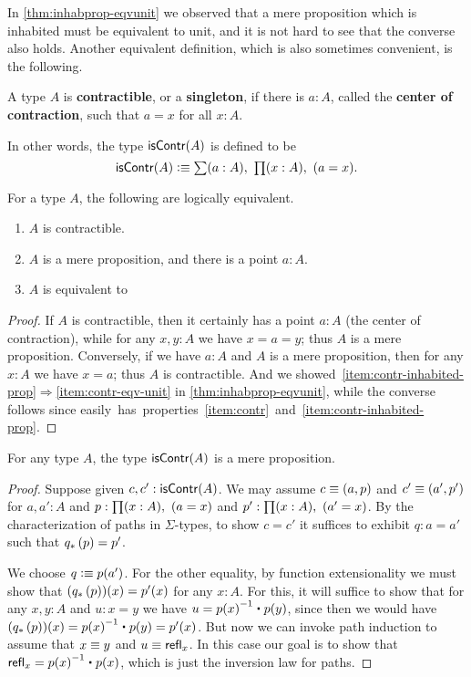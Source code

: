 In \autoref{thm:inhabprop-eqvunit} we observed that a mere proposition which is inhabited must be equivalent to unit, and it is not hard to see that the converse also holds.
Another equivalent definition, which is also sometimes convenient, is the following.

\begin{defn}\label{defn:contractible}
  A type $A$ is \textbf{contractible}, or a \textbf{singleton}, if there is $a:A$, called the \textbf{center of contraction}, such that $a=x$ for all $x:A$.
\end{defn}

In other words, the type $\mathsf{isContr}(A)$ is defined to be
\[ \iscontr(A) \defeq \sm{a:A} \prd{x:A}(a=x). \]

\begin{lem}\label{thm:contr-paths}
  For a type $A$, the following are logically equivalent.
  \begin{enumerate}
  \item $A$ is contractible.\label{item:contr}
  \item $A$ is a mere proposition, and there is a point $a:A$.\label{item:contr-inhabited-prop}
  \item $A$ is equivalent to \unit.\label{item:contr-eqv-unit}
  \end{enumerate}
\end{lem}
\begin{proof}
  If $A$ is contractible, then it certainly has a point $a:A$ (the center of contraction), while for any $x,y:A$ we have $x=a=y$; thus $A$ is a mere proposition.
  Conversely, if we have $a:A$ and $A$ is a mere proposition, then for any $x:A$ we have $x=a$; thus $A$ is contractible.
  And we showed~\ref{item:contr-inhabited-prop}$\Rightarrow$\ref{item:contr-eqv-unit} in \autoref{thm:inhabprop-eqvunit}, while the converse follows since \unit easily has properties~\ref{item:contr} and~\ref{item:contr-inhabited-prop}.
\end{proof}

\begin{lem}\label{thm:isprop-iscontr}
  For any type $A$, the type $\mathsf{isContr}(A)$ is a mere proposition.
\end{lem}
\begin{proof}
  Suppose given $c,c':\mathsf{isContr}(A)$.
  We may assume $c\equiv(a,p)$ and $c'\equiv(a',p')$ for $a,a':A$ and $p:\prd{x:A} (a=x)$ and $p':\prd{x:A} (a'=x)$.
  By the characterization of paths in $\Sigma$-types, to show $c=c'$ it suffices to exhibit $q:a=a'$ such that ${q}_{*}\left({p}\right)=p'$.

  We choose $q\vcentcolon\equiv p(a')$.
  For the other equality, by function extensionality we must show that $({q}_{*}\left({p}\right))(x)=p'(x)$ for any $x:A$.
  For this, it will suffice to show that for any $x,y:A$ and $u:x=y$ we have $u= \opp{p(x)} \ct p(y)$, since then we would have $(\trans q p)(x) = \opp{p(x)} \ct p(y) = p'(x)$.
  But now we can invoke path induction to assume that $x\equiv y$ and $u\equiv \mathsf{refl}_{x}$.
  In this case our goal is to show that $\refl x = \opp{p(x)} \ct p(x)$, which is just the inversion law for paths.
\end{proof}

